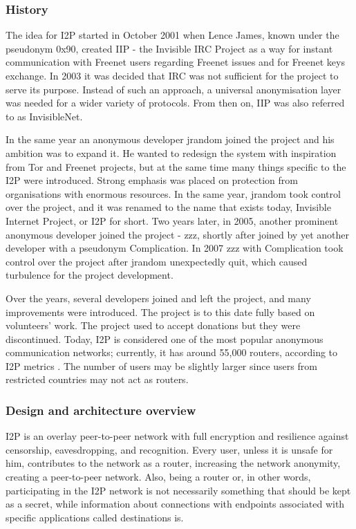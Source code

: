 \subsubsection{History}
The idea for I2P started in October 2001 when Lence James, known under the pseudonym 0x90, created IIP - the Invisible IRC Project as a way for instant communication with Freenet users regarding Freenet issues and for Freenet keys exchange.
In 2003 it was decided that IRC was not sufficient for the project to serve its purpose. Instead of such an approach, a universal anonymisation layer was needed for a wider variety of protocols. From then on, IIP was also referred to as InvisibleNet. 

In the same year an anonymous developer jrandom joined the project and his ambition was to expand it. He wanted to redesign the system with inspiration from Tor and Freenet projects, but at the same time many things specific to the I2P were introduced. Strong emphasis was placed on protection from organisations with enormous resources. In the same year, jrandom took control over the project, and it was renamed to the name that exists today, Invisible Internet Project, or I2P for short. Two years later, in 2005, another prominent anonymous developer joined the project - zzz, shortly after joined by yet another developer with a pseudonym Complication. In 2007 zzz with Complication took control over the project after jrandom unexpectedly quit, which caused turbulence for the project development.

Over the years, several developers joined and left the project, and many improvements were introduced. The project is to this date fully based on volunteers’ work. The project used to accept donations but they were discontinued. Today, I2P is considered one of the most popular anonymous communication networks; currently, it has around 55,000 routers, according to I2P metrics \cite{i2pmetrics, i2pmetrics2}. The number of users may be slightly larger since users from restricted countries may not act as routers.

\subsubsection{Design and architecture overview}
I2P is an overlay peer-to-peer network with full encryption and resilience against censorship, eavesdropping, and recognition. Every user, unless it is unsafe for him, contributes to the network as a router, increasing the network anonymity, creating a peer-to-peer network. Also, being a router or, in other words, participating in the I2P network is not necessarily something that should be kept as a secret, while information about connections with endpoints associated with specific applications called destinations is.

